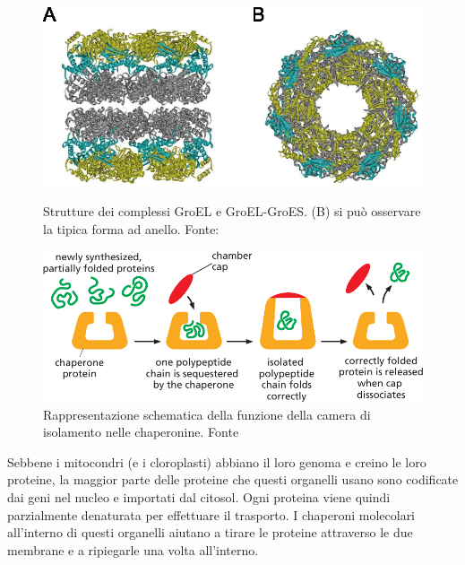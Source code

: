 {\begin{figure}[!htb]
	\includegraphics[scale=0.25]{images/groel.png}
	\caption{Strutture dei complessi GroEL e GroEL-GroES. (B) si può osservare la tipica forma ad anello. Fonte: \cite{Iizuka2016ChaperoninGU}}
	\label{fig:groel}
	\endminipage\hfill
	\centering
	\includegraphics[scale=0.4]{images/chaperone-alberts-isolation.png}
	\caption{Rappresentazione schematica della funzione della camera di isolamento nelle chaperonine. Fonte \cite{alberts2018essential}}
	\label{fig:chaperone-camera}
	\endminipage\hfill
\end{figure}

Sebbene i mitocondri (e i cloroplasti) abbiano il loro genoma e creino le loro proteine, la maggior parte delle proteine che questi organelli usano sono codificate dai geni nel nucleo e importati dal citosol. Ogni proteina viene quindi parzialmente denaturata per effettuare il trasporto. I chaperoni molecolari all'interno di questi organelli aiutano a tirare le proteine attraverso le due membrane e a ripiegarle una volta all'interno\supercite{alberts2018essential}.


}
